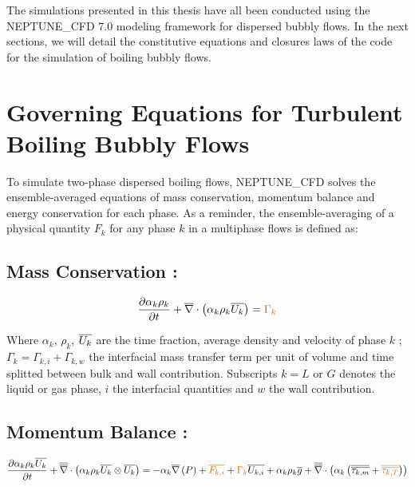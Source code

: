 \npar

The simulations presented in this thesis have all been conducted using the NEPTUNE\_CFD 7.0 modeling framework for dispersed bubbly flows. In the next sections, we will detail the constitutive equations and closures laws of the code for the simulation of boiling bubbly flows.


\section{Governing Equations for Turbulent Boiling Bubbly Flows}

To simulate two-phase dispersed boiling flows, NEPTUNE\_CFD solves the ensemble-averaged equations of mass conservation, momentum balance and energy conservation for each phase. As a reminder, the ensemble-averaging of a physical quantity $F_{k}$ for any phase $k$ in a multiphase flows is defined as:



\subsection{Mass Conservation :}
\begin{equation}
	\label{eq:mass}
	\dtime{\alpha_{k}\rho_{k}} + \divg{\alpha_{k}\rho_{k} \vect{U_{k}}} = \orangemath{\Gamma_{k}}
\end{equation}

Where $\alpha_{k}$, $\rho_{k}$, $\overline{U_{k}}$ are the time fraction, average density and velocity of phase $k$ ; $\Gamma_{k}=\Gamma_{k,i}+\Gamma_{k,w}$ the interfacial mass transfer term per unit of volume and time splitted between bulk and wall contribution.
Subscripts $k= L$ or $G$ denotes the liquid or gas phase, $i$ the interfacial quantities and $w$ the wall contribution.

\subsection{Momentum Balance :}

\begin{equation}
	\label{eq:momentum}
	\dtime{\alpha_{k}\rho_{k}\vect{U_{k}}} + \vecdivg{\alpha_{k}\rho_{k} \vect{U_{k}}\otimes \vect{U_{k}}} = -\alpha_{k}\grad{P} + \orangemath{\vect{F_{k,i}}} + \orangemath{\Gamma_{k}}\vect{U_{k,i}} + \alpha_{k}\rho_{k}\vect{g} + \vecdivg{\alpha_{k} \parth{ \tens{\tau_{k,m}} + \orangemath{\tens{\tau_{k,T}}} }}
\end{equation}

